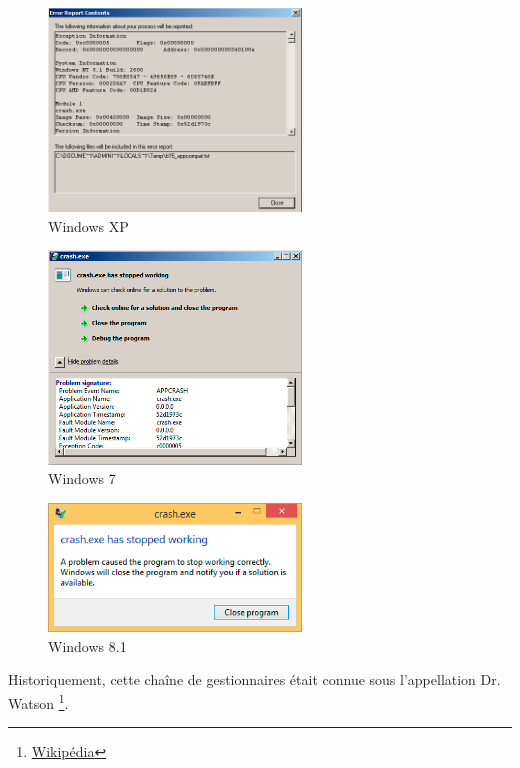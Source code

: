 \begin{figure}[H]
\centering
\includegraphics[width=0.6\textwidth]{OS/SEH/1/crash_xp2.png}
\caption{Windows XP}
\end{figure}

\begin{figure}[H]
\centering
\includegraphics[width=0.6\textwidth]{OS/SEH/1/crash_win7.png}
\caption{Windows 7}
\end{figure}

\begin{figure}[H]
\centering
\includegraphics[width=0.6\textwidth]{OS/SEH/1/crash_win81.png}
\caption{Windows 8.1}
\end{figure}

Historiquement, cette chaîne de gestionnaires était connue sous l'appellation Dr. Watson
\footnote{\href{https://en.wikipedia.org/wiki/Dr._Watson_(debugger)}{Wikipédia}}.

